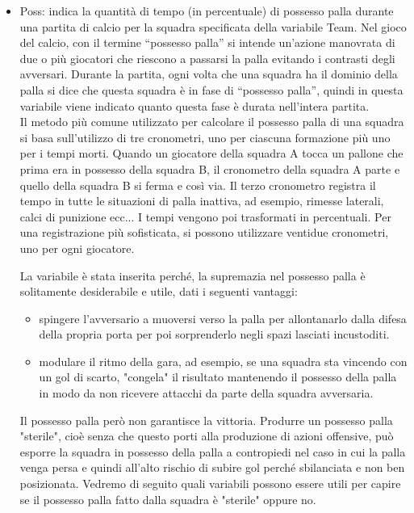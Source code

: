 \begin{itemize}
	
	\item \textsf{Poss}: indica la quantità di tempo (in percentuale) di possesso palla durante una partita di calcio per la squadra specificata della variabile \textsf{Team}. Nel gioco del calcio, con il termine “possesso palla” si intende un’azione manovrata di due o più giocatori che riescono a passarsi la palla evitando i contrasti degli avversari. Durante la partita, ogni volta che una squadra ha il dominio della palla si dice che questa squadra è in fase di “possesso palla”, quindi in questa variabile viene indicato quanto questa fase è durata nell'intera partita.\\
	Il metodo più comune utilizzato per calcolare il possesso palla di una squadra si basa sull'utilizzo di tre cronometri, uno per ciascuna formazione più uno per i tempi morti. Quando un giocatore della squadra A tocca un pallone che prima era in possesso della squadra B, il cronometro della squadra A parte e quello della squadra B si ferma e così via. Il terzo cronometro registra il tempo in tutte le situazioni di palla inattiva, ad esempio, rimesse laterali, calci di punizione ecc... I tempi vengono poi trasformati in percentuali. Per una registrazione più sofisticata, si possono utilizzare ventidue cronometri, uno per ogni giocatore.
	
	La variabile è stata inserita perché, la supremazia nel possesso palla è solitamente desiderabile e utile, dati i seguenti vantaggi:
	\begin{itemize}
		\item spingere l’avversario a muoversi verso la palla per allontanarlo dalla difesa della propria porta per poi sorprenderlo negli spazi lasciati incustoditi.   
		\item modulare il ritmo della gara, ad esempio, se una squadra sta vincendo con un gol di scarto, "congela" il risultato mantenendo il possesso della palla in modo da non ricevere attacchi da parte della squadra avversaria.
	\end{itemize}
	Il possesso palla però non garantisce la vittoria. Produrre un possesso palla "sterile", cioè senza che questo porti alla produzione di azioni offensive, può esporre la squadra in possesso della palla a contropiedi nel caso in cui la palla venga persa e quindi all'alto rischio di subire gol perché sbilanciata e non ben posizionata. Vedremo di seguito quali variabili possono essere utili per capire se il possesso palla fatto dalla squadra è "sterile" oppure no.
	

\end{itemize}
